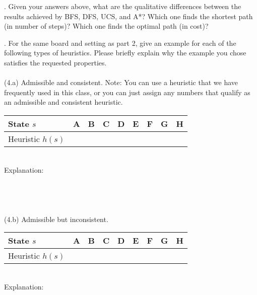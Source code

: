 \documentclass{article}
\begin{document}
\newpage
{}. Given your answers above, what are the qualitative differences between the results achieved by BFS, DFS, UCS, and A*? Which one finds the shortest path (in number of steps)? Which one finds the optimal path (in cost)?



\newpage
{}. For the same board and setting as part 2, give an example for each of the following types of heuristics. Please briefly explain why the example you chose satisfies the requested properties. \\
~\\
(4.a) Admissible and consistent.
Note: You can use a heuristic that we have frequently used in this class, or you can just assign any numbers that qualify as an admissible and consistent heuristic.
\renewcommand\arraystretch{1.5}
\begin{table}[tbh!]
\begin{center}
    \begin{tabular}{|p{2cm}| p{1cm}| p{1cm} | p{1cm}| p{1cm} | p{1cm}| p{1cm} | p{1cm}| p{1cm}|}
\hline
    State $s$  & A & B & C & D & E & F & G & H \\ \hline
    Heuristic $h(s)$ &   &   &   &  &   &   &   &  \\
\hline
\end{tabular}
\end{center}
\end{table}
~\\
Explanation: \\
~\\
~\\
~\\
~\\
(4.b) Admissible but inconsistent.
\renewcommand\arraystretch{1.5}
\begin{table}[tbh!]
\begin{center}
    \begin{tabular}{|p{2cm}| p{1cm}| p{1cm} | p{1cm}| p{1cm} | p{1cm}| p{1cm} | p{1cm}| p{1cm}|}
\hline
    State $s$  & A & B & C & D & E & F & G & H \\ \hline
    Heuristic $h(s)$ &   &   &   &  &   &   &   &  \\
\hline
\end{tabular}
\end{center}
\end{table}
~\\
Explanation: 
~\\
~\\
~\\
\end{document}
